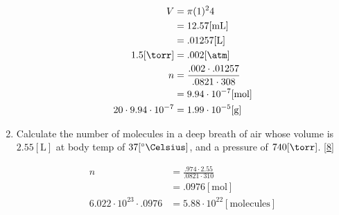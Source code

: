 \documentclass[12pt]{article}
\begin{document}
\begin{enumerate}
      \begin{equation}
        \begin{split}
          V&=\pi(1)^24\\
          &=12.57[\si{\milli\liter}]\\
          &=.01257[\si{\liter}]\\
          1.5[\si{\torr}]&=.002[\si{\atm}]\\
          n&=\frac{.002\cdot.01257}{.0821\cdot308}\\
          &=9.94\cdot10^{-7}[\si{\mole}]\\
          20\cdot9.94\cdot10^{-7}&=1.99\cdot10^{-5}[\si{\gram}]
        \end{split}
        \label{7}
      \end{equation}

    \item Calculate the number of molecules in a deep breath of air whose volume is $2.55[\si{\liter}]$ at body temp of $37[^{\circ}\si{\Celsius}]$, and a pressure of $740[\si{\torr}]$. \eqref{8}

      \begin{equation}
        \begin{split}
          n&=\frac{.974\cdot2.55}{.0821\cdot310}\\
          &=.0976[\si{\mole}]\\
          6.022\cdot10^{23}\cdot.0976&=5.88\cdot10^{22}[\text{molecules}]
        \end{split}
        \label{8}
      \end{equation}

\end{enumerate}
\end{document}
